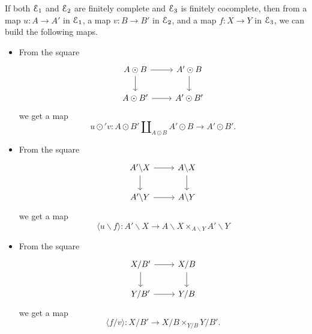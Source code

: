 \documentclass[main.tex]{subfiles}
\begin{document}
If both $\mathcal{E}_{1}$ and $\mathcal{E}_{2}$ are finitely complete and $\mathcal{E}_{3}$ is finitely cocomplete, then from a map $u\colon A \to A'$ in $\mathcal{E}_{1}$, a map $v\colon B \to B'$ in $\mathcal{E}_{2}$, and a map $f\colon X \to Y$ in $\mathcal{E}_{3}$, we can build the following maps.
\begin{itemize}
  \item From the square
    \begin{equation*}
      \begin{tikzcd}
        A \odot B
        \arrow[r]
        \arrow[d]
        & A' \odot B
        \arrow[d]
        \\
        A \odot B'
        \arrow[r]
        & A' \odot B'
      \end{tikzcd}
    \end{equation*}
    we get a map
    \begin{equation*}
      u \odot' v\colon A \odot B' \amalg_{A \odot B} A' \odot B \to A' \odot B'.
    \end{equation*}

  \item From the square
    \begin{equation*}
      \begin{tikzcd}
        A' \backslash X
        \arrow[r]
        \arrow[d]
        & A \backslash X
        \arrow[d]
        \\
        A' \backslash Y
        \arrow[r]
        & A \backslash Y
      \end{tikzcd}
    \end{equation*}
    we get a map
    \begin{equation*}
      \langle u \backslash f \rangle\colon A' \backslash X \to A \backslash X \times_{A \backslash Y} A' \backslash Y
    \end{equation*}

  \item From the square
    \begin{equation*}
      \begin{tikzcd}
        X / B'
        \arrow[r]
        \arrow[d]
        & X / B
        \arrow[d]
        \\
        Y / B'
        \arrow[r]
        & Y / B
      \end{tikzcd}
    \end{equation*}
    we get a map
    \begin{equation*}
      \langle f / v \rangle\colon X / B' \to X / B \times_{Y / B} Y / B'.
    \end{equation*}
\end{itemize}
\end{document}
